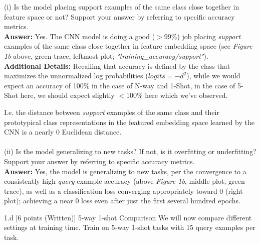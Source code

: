 \begin{answer}
    
    \large
    (i) Is the model placing support examples of the same class close together in feature space or not? Support your answer by referring to specific accuracy metrics.
    \normalsize
    \\
    
    \textbf{Answer:} Yes. The CNN model is doing a good ($>$99\%) job placing \textit{support} examples of the same class close together in feature embedding space (see \textit{Figure 1b} above, green trace, leftmost plot; \textit{"training\_accuracy\slash support"}). 
    \\
    
    \textbf{Additional Details:}
    Recalling that accuracy is defined by the class that maximizes the unnormalized log probabilities ($logits = {-d}^2$), while we would expect an accuracy of 100\% in the case of N-way and 1-Shot, in the case of 5-Shot here, we should expect slightly $<$100\% here which we've observed. 
    
    I.e. the distance between \textit{support} examples of the same class and their prototypical class representations in the featured embedding space learned by the CNN is a nearly 0 Euclidean distance.
    \\
    \\
    
    \large
    (ii) Is the model generalizing to new tasks? If not, is it overfitting or underfitting? Support your answer by referring to specific accuracy metrics.
    \normalsize
    \\
    
    \textbf{Answer:} Yes, the model is generalizing to new tasks, per the convergence to a consistently high \textit{query} example accuracy (above \textit{Figure 1b}, middle plot, green trace), as well as a classification loss converging appropriately toward 0 (right plot); achieving a near 0 loss even after just the first several hundred epochs.
    \\
        
\end{answer}

\clearpage

\LARGE
1.d [6 points (Written)] 5-way 1-shot Comparison We will now compare different settings at training time. Train on 5-way 1-shot tasks with 15 query examples per task.
\normalsize

